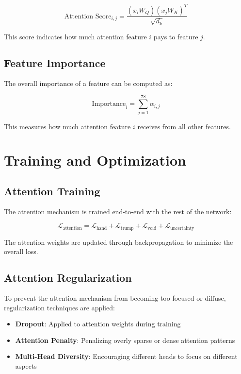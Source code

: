 \documentclass[conference]{IEEEtran}
\begin{document}
\begin{equation}
\text{Attention Score}_{i,j} = \frac{(x_iW_Q)(x_jW_K)^T}{\sqrt{d_k}}
\end{equation}

This score indicates how much attention feature $i$ pays to feature $j$.

\subsection{Feature Importance}

The overall importance of a feature can be computed as:

\begin{equation}
\text{Importance}_i = \sum_{j=1}^{78} \alpha_{i,j}
\end{equation}

This measures how much attention feature $i$ receives from all other features.

\section{Training and Optimization}

\subsection{Attention Training}

The attention mechanism is trained end-to-end with the rest of the network:

\begin{equation}
\mathcal{L}_{\text{attention}} = \mathcal{L}_{\text{hand}} + \mathcal{L}_{\text{trump}} + \mathcal{L}_{\text{void}} + \mathcal{L}_{\text{uncertainty}}
\end{equation}

The attention weights are updated through backpropagation to minimize the overall loss.

\subsection{Attention Regularization}

To prevent the attention mechanism from becoming too focused or diffuse, regularization techniques are applied:

\begin{itemize}
    \item \textbf{Dropout}: Applied to attention weights during training
    \item \textbf{Attention Penalty}: Penalizing overly sparse or dense attention patterns
    \item \textbf{Multi-Head Diversity}: Encouraging different heads to focus on different aspects
\end{itemize}
\end{document}
